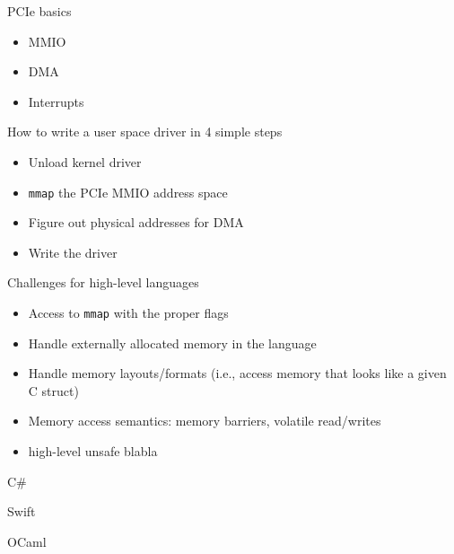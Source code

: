 \documentclass[NET,english,aspectratio=169,notitleframe]{tumbeamer}
\begin{document}
\begin{frame}{PCIe basics}
\begin{itemize}
\item MMIO
\item DMA
\item Interrupts
\end{itemize}
\end{frame}



\begin{frame}{How to write a user space driver in 4 simple steps}
\begin{itemize}
\item[1.] Unload kernel driver
\item[2.] \texttt{mmap} the PCIe MMIO address space
\item[3.] Figure out physical addresses for DMA
\item[4.] Write the driver
\end{itemize}
\end{frame}


\begin{frame}{Challenges for high-level languages}
\begin{itemize}
\item Access to \texttt{mmap} with the proper flags
\item Handle externally allocated memory in the language
\item Handle memory layouts/formats (i.e., access memory that looks like a given C struct)
\item Memory access semantics: memory barriers, volatile read/writes
\vspace{1em}
\pause
\item high-level unsafe blabla
\end{itemize}
\end{frame}



\begin{frame}{C\#}
\end{frame}

\begin{frame}{Swift}
\end{frame}

\begin{frame}{OCaml}
\end{frame}
\end{document}
